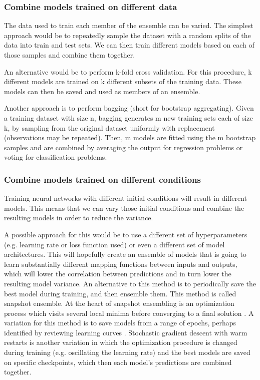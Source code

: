 \subsubsection{Combine models trained on different data}
    The data used to train each member of the ensemble can be varied. 
    The simplest approach would be to repeatedly sample the dataset with a random splits of the data into train and test sets. We can then train different models based on each of those samples and combine them together.  \par
    An alternative would be to perform k-fold cross validation. For this procedure, k different models are trained on k different subsets of the training data. These models can then be saved and used as members of an ensemble. \par
    Another approach is to perform bagging (short for bootstrap aggregating). Given a training dataset with size n, bagging generates m new training sets each of size k, by sampling from the original dataset uniformly with replacement (observations may be repeated). Then, m models are fitted using the m bootstrap samples and are combined by averaging the output for regression problems or voting for classification problems. \par

\subsubsection{Combine models trained on different conditions}
    Training neural networks with different initial conditions will result in different models. This means that we can vary those initial conditions and combine the resulting models in order to reduce the variance. \par
    A possible approach for this would be to use a different set of hyperparameters (e.g. learning rate or loss function used) or even a different set of model architectures. This will hopefully create an ensemble of models that is going to learn substantially different mapping functions between inputs and outputs, which will lower the correlation between predictions and in turn lower the resulting model variance.
    An alternative to this method is to periodically save the best model during training, and then ensemble them. This method is called snapshot ensemble. At the heart of snapshot ensembling is an optimization process which visits several local minima before converging to a final solution \cite{snapshot}. A variation for this method is to save models from a range of epochs, perhaps identified by reviewing learning curves \cite{horizontalvertical}. Stochastic gradient descent with warm restarts \cite{sgdr} is another variation in which the optimization procedure is changed during training (e.g. oscillating the learning rate) and the best models are saved on specific checkpoints, which then each model's predictions are combined together. \par
    
